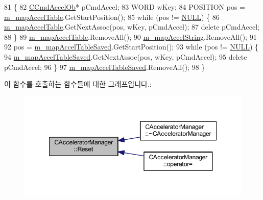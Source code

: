 \begin{DoxyCode}
81 \{
82   \mbox{\hyperlink{class_c_cmd_accel_ob}{CCmdAccelOb}}* pCmdAccel;
83   WORD wKey;
84   POSITION pos = \mbox{\hyperlink{class_c_accelerator_manager_a16b8d3e9328bc0eeeb048630deff2768}{m\_mapAccelTable}}.GetStartPosition();
85   \textcolor{keywordflow}{while} (pos != \mbox{\hyperlink{getopt1_8c_a070d2ce7b6bb7e5c05602aa8c308d0c4}{NULL}}) \{
86     \mbox{\hyperlink{class_c_accelerator_manager_a16b8d3e9328bc0eeeb048630deff2768}{m\_mapAccelTable}}.GetNextAssoc(pos, wKey, pCmdAccel);
87     \textcolor{keyword}{delete} pCmdAccel;
88   \}
89   \mbox{\hyperlink{class_c_accelerator_manager_a16b8d3e9328bc0eeeb048630deff2768}{m\_mapAccelTable}}.RemoveAll();
90   \mbox{\hyperlink{class_c_accelerator_manager_abb40dbb1a44c47ac22590e8f1243835b}{m\_mapAccelString}}.RemoveAll();
91 
92   pos = \mbox{\hyperlink{class_c_accelerator_manager_ad7c3ac9a16b8f19e0b5524d8582a5fae}{m\_mapAccelTableSaved}}.GetStartPosition();
93   \textcolor{keywordflow}{while} (pos != \mbox{\hyperlink{getopt1_8c_a070d2ce7b6bb7e5c05602aa8c308d0c4}{NULL}}) \{
94     \mbox{\hyperlink{class_c_accelerator_manager_ad7c3ac9a16b8f19e0b5524d8582a5fae}{m\_mapAccelTableSaved}}.GetNextAssoc(pos, wKey, pCmdAccel);
95     \textcolor{keyword}{delete} pCmdAccel;
96   \}
97   \mbox{\hyperlink{class_c_accelerator_manager_ad7c3ac9a16b8f19e0b5524d8582a5fae}{m\_mapAccelTableSaved}}.RemoveAll();
98 \}
\end{DoxyCode}
이 함수를 호출하는 함수들에 대한 그래프입니다.\+:
\nopagebreak
\begin{figure}[H]
\begin{center}
\leavevmode
\includegraphics[width=348pt]{class_c_accelerator_manager_aca456cda1a5f9b17bcfaea4f8ff45903_icgraph}
\end{center}
\end{figure}
\mbox{\label{class_c_accelerator_manager_a96957fd8ed0a15d0dbc508359824db3c}} 
